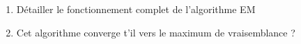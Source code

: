 \documentclass[a4paper,10pt,fleqn]{article}
\newcommand{\1}{\ensuremath{\mathbbm{1}}}
\begin{document}
\begin{enumerate}
\begin{enumerate}
%
\item D\'etailler le fonctionnement complet de l'algorithme EM

%
\item Cet algorithme converge t'il vers le maximum de vraisemblance ?
%
%
\end{enumerate}
\end{enumerate}
\end{document}
